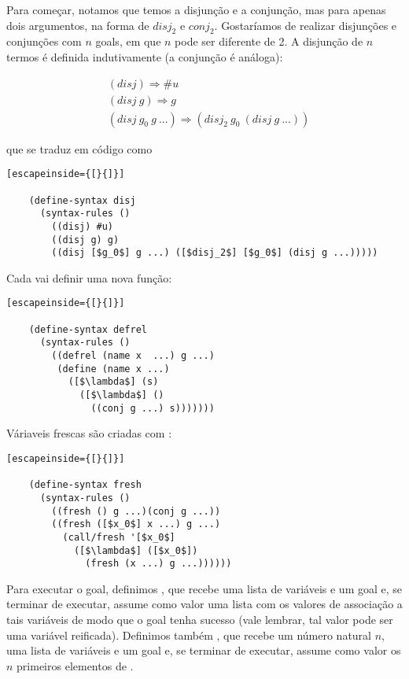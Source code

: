 \documentclass{article}
\begin{document}
  Para começar, notamos que temos a disjunção e a conjunção, mas para
  apenas dois argumentos, na forma de  $disj_2$ e $conj_2$. Gostaríamos
  de realizar disjunções e conjunções com $n$ goals, em que $n$ pode
  ser diferente de 2. A disjunção de $n$ termos é definida
  indutivamente (a conjunção é análoga):

  \begin{align*}
    &(disj) \Rightarrow \#u \\
    &(disj\ g) \Rightarrow g \\
    &(disj\ g_0\ g\ ...) \Rightarrow (disj_2\ g_0\ (disj\ g\ ...))
  \end{align*}

  \noindent que se traduz em código como

  \begin{lstlisting}[escapeinside={[}{]}]

    (define-syntax disj
      (syntax-rules ()
        ((disj) #u)
        ((disj g) g)
        ((disj [$g_0$] g ...) ([$disj_2$] [$g_0$] (disj g ...)))))

  \end{lstlisting}

  Cada  vai definir uma nova função:

  \begin{lstlisting}[escapeinside={[}{]}]

    (define-syntax defrel
      (syntax-rules ()
        ((defrel (name x  ...) g ...)
         (define (name x ...)
           ([$\lambda$] (s)
             ([$\lambda$] ()
               ((conj g ...) s)))))))

  \end{lstlisting}
             
  Váriaveis frescas são criadas com :

  \begin{lstlisting}[escapeinside={[}{]}]

    (define-syntax fresh
      (syntax-rules ()
        ((fresh () g ...)(conj g ...))
        ((fresh ([$x_0$] x ...) g ...)
          (call/fresh '[$x_0$]
            ([$\lambda$] ([$x_0$])
              (fresh (x ...) g ...))))))

  \end{lstlisting}
  
  Para executar o goal, definimos , que recebe uma
  lista de variáveis e um goal e, se terminar de executar, assume como
  valor uma lista com os valores de associação a tais variáveis de modo
  que o goal tenha sucesso (vale lembrar, tal valor pode ser uma
  variável reificada). Definimos também , que recebe
  um número natural $n$, uma lista de variáveis e um goal e, se
  terminar de executar, assume como valor os $n$ primeiros elementos
  de .
\end{document}
